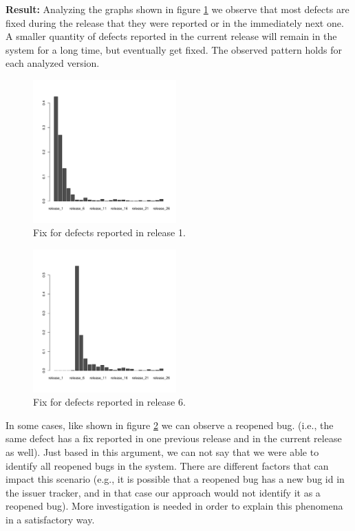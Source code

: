 \vspace{1mm}
\noindent\textbf{Result:} Analyzing the graphs shown in figure \ref{fig:defect_release_1} we observe that most defects are fixed during the release that they were reported or in the immediately next one. A smaller quantity of defects reported in the current release will remain in the system for a long time, but eventually get fixed. The observed pattern holds for each analyzed version. 

\begin{figure}[thb!]
	\caption{Fix for defects reported in release 1.}
	\label{fig:defect_release_1}
	\includegraphics[width=0.49\textwidth]{figures/r1}
\end{figure}

\begin{figure}[thb!]
	\caption{Fix for defects reported in release 6.}
	\label{fig:defect_release_6}
	\includegraphics[width=0.49\textwidth]{figures/r6}
\end{figure}

In some cases, like shown in figure \ref{fig:defect_release_6} we can observe a reopened bug. (i.e., the same defect has a fix reported in one previous release and in the current release as well). Just based in this argument, we can not say that we were able to identify all reopened bugs in the system. There are different factors that can impact this scenario (e.g., it is possible that a reopened bug has a new bug id in the issuer tracker, and in that case our approach would not identify it as a reopened bug). More investigation is needed in order to explain this phenomena in a satisfactory way. 


